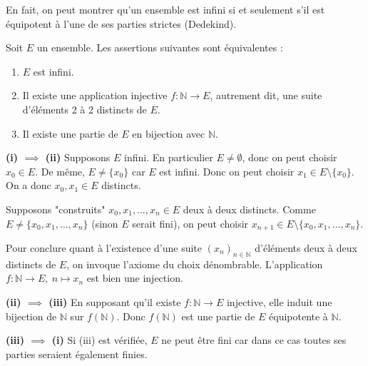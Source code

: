 \documentclass[a4paper,11pt]{article}
\newcommand{\N}{\mathbb{N}}
\begin{document}
En fait, on peut montrer qu'un ensemble est infini si et seulement s'il est équipotent à l'une de ses parties strictes (Dedekind).

\begin{proposition}
Soit $E$ un ensemble. Les assertions suivantes sont équivalentes :
\begin{enumerate}
    \item[(i)] $E$ est infini.
    \item[(ii)] Il existe une application injective $f : \N \to E$, autrement dit, une suite d'éléments 2 à 2 distincts de $E$.
    \item[(iii)] Il existe une partie de $E$ en bijection avec $\N$.
\end{enumerate}
\end{proposition}

\begin{demonstration}
\textbf{(i) $\implies$ (ii)}
Supposons $E$ infini. En particulier $E \neq \emptyset$, donc on peut choisir $x_0 \in E$.
De même, $E \neq \{x_0\}$ car $E$ est infini. Donc on peut choisir $x_1 \in E \setminus \{x_0\}$. On a donc $x_0, x_1 \in E$ distincts.

Supposons "construits" $x_0, x_1, \dots, x_n \in E$ deux à deux distincts.
Comme $E \neq \{x_0, x_1, \dots, x_n\}$ (sinon $E$ serait fini), on peut choisir $x_{n+1} \in E \setminus \{x_0, x_1, \dots, x_n\}$.

Pour conclure quant à l'existence d'une suite $(x_n)_{n \in \N}$ d'éléments deux à deux distincts de $E$, on invoque l'axiome du choix dénombrable.
L'application $f : \N \to E, \ n \mapsto x_n$ est bien une injection.

\vspace{10pt}
\textbf{(ii) $\implies$ (iii)}
En supposant qu'il existe $f : \N \to E$ injective, elle induit une bijection de $\N$ sur $f(\N)$.
Donc $f(\N)$ est une partie de $E$ équipotente à $\N$.

\vspace{10pt}
\textbf{(iii) $\implies$ (i)}
Si (iii) est vérifiée, $E$ ne peut être fini car dans ce cas toutes ses parties seraient également finies.
\end{demonstration}
\end{document}
